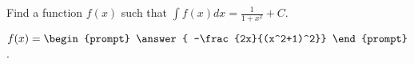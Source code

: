 \documentclass{ximera}
\author{Jim Talamo}
\begin{document}
\begin{exercise}
Find a function $f(x)$ such that $\int f(x) dx = \frac{1}{1+x^2} +C$. 

$f(x) = \begin{prompt} \answer{ -\frac{2x}{(x^2+1)^2}} \end{prompt}$.


\end{exercise}
\end{document}

